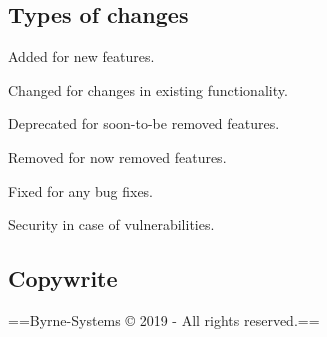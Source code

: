 \subsection*{Types of changes}


\begin{DoxyItemize}
\item {\ttfamily Added} for new features.
\item {\ttfamily Changed} for changes in existing functionality.
\item {\ttfamily Deprecated} for soon-\/to-\/be removed features.
\item {\ttfamily Removed} for now removed features.
\item {\ttfamily Fixed} for any bug fixes.
\item {\ttfamily Security} in case of vulnerabilities.
\end{DoxyItemize}

\subsection*{Copywrite}



==Byrne-\/\+Systems © 2019 -\/ All rights reserved.== 